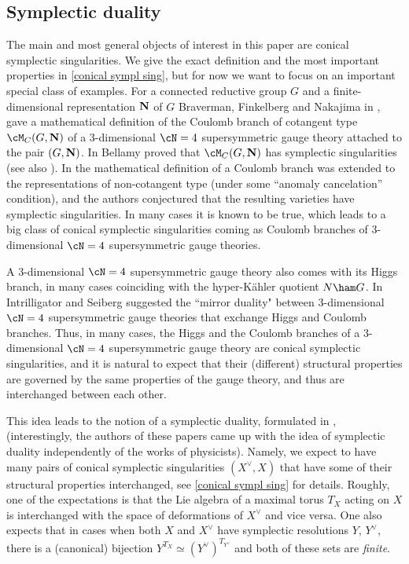 \documentclass[12pt]{amsart}
\begin{document}
\subsection{Symplectic duality}
    The main and most general objects of interest in this paper are conical symplectic singularities. We give the exact definition and the most important properties in \cref{conical sympl sing}, but for now we want to focus on an important special class of examples. For a connected reductive group $G$ and a finite-dimensional representation ${\bf{N}}$ of $G$ Braverman, Finkelberg and Nakajima in \cite{nakajima_coulombI}, \cite{BFNII} gave a mathematical definition of the Coulomb branch of cotangent type $\cM_C(G, {\bf{N}})$ of a $3$-dimensional $\cN=4$ supersymmetric gauge theory attached to the pair $(G,{\bf{N}})$. In \cite{bellamy} Bellamy proved that $\cM_C(G, {\bf{N}})$ has symplectic singularities (see also \cite{weekes_sympl_sing}). In \cite{Coulomb_noncotangent} the mathematical definition of a Coulomb branch was extended to the representations of non-cotangent type (under some ``anomaly cancelation'' condition), and the authors conjectured that the resulting varieties have symplectic singularities. In many cases it is known to be true, which leads to a big class of conical symplectic singularities coming as Coulomb branches of $3$-dimensional $\cN=4$ supersymmetric gauge theories. 

    A $3$-dimensional $\cN=4$ supersymmetric gauge theory also comes with its Higgs branch, in many cases coinciding with the hyper-K{\"a}hler quotient $N\ham G$. In \cite{Intriligator1996} Intrilligator and Seiberg suggested the ``mirror duality" between $3$-dimensional $\cN=4$ supersymmetric gauge theories that exchange Higgs and Coulomb branches. Thus, in many cases, the Higgs and the Coulomb branches of a $3$-dimensional $\cN=4$ supersymmetric gauge theory are conical symplectic singularities, and it is natural to expect that their (different) structural properties are governed by the same properties of the gauge theory, and thus are interchanged between each other. 

    This idea leads to the notion of a symplectic duality, formulated in \cite{BPW}, \cite{BPWII} (interestingly, the authors of these papers came up with the idea of symplectic duality independently of the works of physicists). Namely, we expect to have many pairs of conical symplectic singularities $(X^\vee, X)$ that have some of their structural properties interchanged, see \cref{conical sympl sing} for details. Roughly, one of the expectations is that the Lie algebra of a maximal torus $T_X$ acting on  $X$ is interchanged with the space of deformations of $X^\vee$ and vice versa. One also expects that in cases when both $X$ and $X^\vee$ have symplectic resolutions $Y$, $Y^\vee$, there is a (canonical) bijection $Y^{T_X} \simeq (Y^\vee)^{T_{Y^\vee}}$ and both of these sets are {\emph{finite}}.
\end{document}
